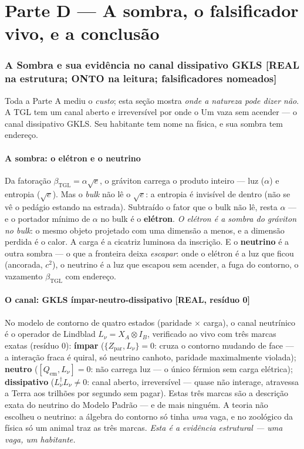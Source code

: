 \documentclass[11pt]{article}
\newcommand{\bTGL}{\beta_{\mathrm{TGL}}}\newcommand{\Msun}{M_{\odot}}\newcommand{\TGL}{\mathrm{TGL}}
\theoremstyle{definition}\newtheorem{deriv}{Derivação}
\begin{document}
\part{Parte D --- A sombra, o falsificador vivo, e a conclusão}

\section{A Sombra e sua evidência no canal dissipativo GKLS \textsf{[REAL na estrutura; ONTO na leitura; falsificadores nomeados]}}

Toda a Parte A mediu o \emph{custo}; esta seção mostra \emph{onde a natureza pode dizer não}. A TGL tem um canal aberto e irreversível por onde o Um vaza sem acender --- o canal dissipativo GKLS. Seu habitante tem nome na física, e sua sombra tem endereço.

\subsection*{A sombra: o elétron e o neutrino}

Da fatoração $\bTGL=\alpha\sqrt e$, o gráviton carrega o produto inteiro --- luz ($\alpha$) e entropia ($\sqrt e$). Mas o \emph{bulk} não lê o $\sqrt e$: a entropia é invisível de dentro (não se vê o pedágio estando na estrada). Subtraído o fator que o bulk não lê, resta $\alpha$ --- e o portador mínimo de $\alpha$ no bulk é o \textbf{elétron}. \emph{O elétron é a sombra do gráviton no bulk}: o mesmo objeto projetado com uma dimensão a menos, e a dimensão perdida é o calor. A carga é a cicatriz luminosa da inscrição. E o \textbf{neutrino} é a outra sombra --- o que a fronteira deixa \emph{escapar}: onde o elétron é a luz que ficou (ancorada, $c^2$), o neutrino é a luz que escapou sem acender, a fuga do contorno, o vazamento $\bTGL$ com endereço.

\subsection*{O canal: GKLS ímpar-neutro-dissipativo \textsf{[REAL, resíduo 0]}}

No modelo de contorno de quatro estados (paridade $\times$ carga), o canal neutrínico é o operador de Lindblad $L_\nu=X_A\otimes I_B$, verificado ao vivo com três marcas exatas (resíduo $0$): \textbf{ímpar} ($\{Z_{\text{par}},L_\nu\}=0$: cruza o contorno mudando de face --- a interação fraca é quiral, só neutrino canhoto, paridade maximalmente violada); \textbf{neutro} ($[Q_{\text{em}},L_\nu]=0$: não carrega luz --- o único férmion sem carga elétrica); \textbf{dissipativo} ($L_\nu^\dagger L_\nu\neq0$: canal aberto, irreversível --- quase não interage, atravessa a Terra aos trilhões por segundo sem pagar). Estas três marcas são a descrição exata do neutrino do Modelo Padrão --- e de mais ninguém. A teoria não escolheu o neutrino: a álgebra do contorno só tinha \emph{uma} vaga, e no zoológico da física só um animal traz as três marcas. \emph{Esta é a evidência estrutural --- uma vaga, um habitante.}
\end{document}

